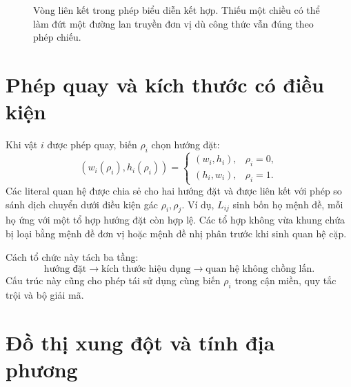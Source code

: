 \begin{figure}[tb]
\centering
{}
\caption{Vòng liên kết trong phép biểu diễn kết hợp. Thiếu một chiều có thể làm
đứt một đường lan truyền đơn vị dù công thức vẫn đúng theo phép chiếu.}
\label{fig:channeling-loop}
\end{figure}

\section{Phép quay và kích thước có điều kiện}

Khi vật \(i\) được phép quay, biến \(\rho_i\) chọn hướng đặt:
\[
  (w_i(\rho_i),h_i(\rho_i))
  =
  \begin{cases}
    (w_i,h_i),&\rho_i=0,\\
    (h_i,w_i),&\rho_i=1.
  \end{cases}
\]
Các literal quan hệ được chia sẻ cho hai hướng đặt và được liên kết với phép
so sánh dịch chuyển dưới điều kiện gác \(\rho_i,\rho_j\). Ví dụ, \(L_{ij}\)
sinh bốn họ mệnh đề, mỗi họ ứng với một tổ hợp hướng đặt còn hợp lệ. Các tổ
hợp không vừa khung chứa bị loại bằng mệnh đề đơn vị hoặc mệnh đề nhị phân
trước khi sinh quan hệ cặp.

Cách tổ chức này tách ba tầng:
\[
  \text{hướng đặt}
  \longrightarrow
  \text{kích thước hiệu dụng}
  \longrightarrow
  \text{quan hệ không chồng lấn}.
\]
Cấu trúc này cũng cho phép tái sử dụng cùng biến \(\rho_i\) trong cận miền, quy tắc trội
và bộ giải mã.

\section{Đồ thị xung đột và tính địa phương}

